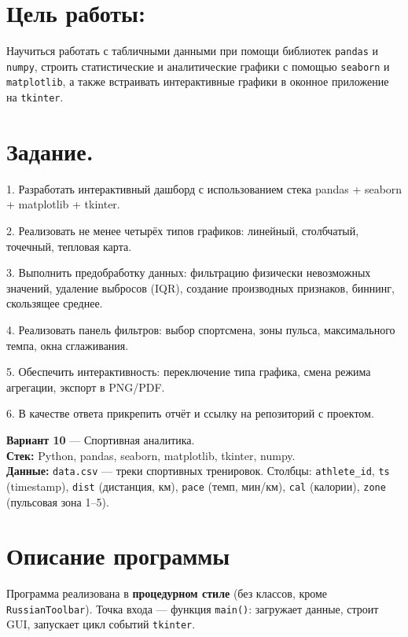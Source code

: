 \documentclass[oneside,a4paper,14pt]{extarticle}
\begin{document}
\begin{flushleft}
\section*{Цель работы:}
\noindent Научиться работать с табличными данными при помощи библиотек \texttt{pandas} и \texttt{numpy}, строить статистические и аналитические графики с помощью \texttt{seaborn} и \texttt{matplotlib}, а также встраивать интерактивные графики в оконное приложение на \texttt{tkinter}.

\section*{Задание.}

1. Разработать интерактивный дашборд с использованием стека pandas + seaborn + matplotlib + tkinter.

2. Реализовать не менее четырёх типов графиков: линейный, столбчатый, точечный, тепловая карта.

3. Выполнить предобработку данных: фильтрацию физически невозможных значений, удаление выбросов (IQR), создание производных признаков, биннинг, скользящее среднее.

4. Реализовать панель фильтров: выбор спортсмена, зоны пульса, максимального темпа, окна сглаживания.

5. Обеспечить интерактивность: переключение типа графика, смена режима агрегации, экспорт в PNG/PDF.

6. В качестве ответа прикрепить отчёт и ссылку на репозиторий с проектом.

\textbf{Вариант 10} --- Спортивная аналитика.\\
\textbf{Стек:} Python, pandas, seaborn, matplotlib, tkinter, numpy.\\
\textbf{Данные:} \texttt{data.csv} --- треки спортивных тренировок. Столбцы: \texttt{athlete\_id}, \texttt{ts} (timestamp), \texttt{dist} (дистанция, км), \texttt{pace} (темп, мин/км), \texttt{cal} (калории), \texttt{zone} (пульсовая зона 1--5).

\section*{Описание программы}

Программа реализована в \textbf{процедурном стиле} (без классов, кроме \texttt{RussianToolbar}). Точка входа --- функция \texttt{main()}: загружает данные, строит GUI, запускает цикл событий \texttt{tkinter}.


\end{flushleft}
\end{document}
